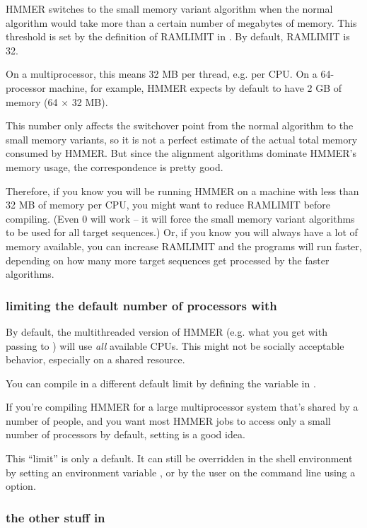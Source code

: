 HMMER switches to the small memory variant algorithm when the normal
algorithm would take more than a certain number of megabytes of
memory. This threshold is set by the definition of RAMLIMIT in
. By default, RAMLIMIT is 32. 

On a multiprocessor, this means 32 MB per thread, e.g. per CPU. On a
64-processor machine, for example, HMMER expects by default to have 2
GB of memory (64 $\times$ 32 MB).

This number only affects the switchover point from the normal
algorithm to the small memory variants, so it is not a perfect
estimate of the actual total memory consumed by HMMER. But since the
alignment algorithms dominate HMMER's memory usage, the correspondence
is pretty good.

Therefore, if you know you will be running HMMER on a machine with
less than 32 MB of memory per CPU, you might want to reduce RAMLIMIT
before compiling. (Even 0 will work -- it will force the small memory
variant algorithms to be used for all target sequences.) Or, if you
know you will always have a lot of memory available, you can increase
RAMLIMIT and the programs will run faster, depending on how many more
target sequences get processed by the faster algorithms.

\subsubsection{limiting the default number of processors with }

By default, the multithreaded version of HMMER (e.g. what you get with
passing  to ) will use
\emph{all} available CPUs. This might not be socially acceptable
behavior, especially on a shared resource. 

You can compile in a different default limit by defining the
 variable in .

If you're compiling HMMER for a large multiprocessor system that's
shared by a number of people, and you want most HMMER jobs to access
only a small number of processors by default, setting
 is a good idea.

This ``limit'' is only a default. It can still be overridden in the
shell environment by setting an environment variable
, or by the user on the command line using a
 option.

\subsubsection{the other stuff in }
\label{section:alphabet-config}

